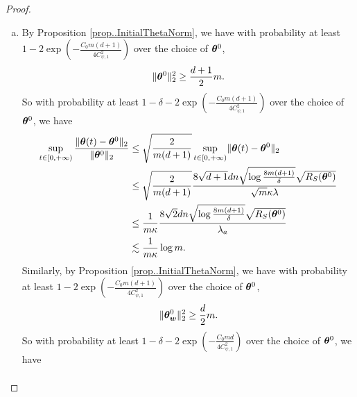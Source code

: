 \documentclass{article}
\begin{document}
\begin{proof}
\begin{enumerate}[(a)]
\begin{enumerate}[(i)]
\begin{equation*}
                        \end{equation*}
                        Suppose that $t^*_a<+\infty$ then one can take the limit $t\to t^*_a$ in~\eqref{thm-proof:w-step1}. This will lead to a contradiction with the definition of $t^*_a$. Therefore $t^*_a=+\infty$.
              \end{enumerate}
        \item By Proposition \ref{prop..InitialThetaNorm}, we have with probability at least $1-2\exp(-\frac{C_0m(d+1)}{4C_{\psi,1}^2})$ over the choice of $\bm{\theta}^0$,
              \begin{equation*}
                  \lVert\bm{\theta}^0\rVert^2_2\geq\frac{d+1}{2}m.
              \end{equation*}
              So with probability at least $1-\delta-2\exp\left(-\frac{C_0m(d+1)}{4C^2_{\psi,1}}\right)$ over the choice of $\bm{\theta}^0$, we have
              \begin{equation*}
                  \begin{aligned}
                      \sup\limits_{t\in[0,+\infty)}\frac{\lVert\bm{\theta}(t)-\bm{\theta}^0\rVert_2}{\lVert\bm{\theta}^0\rVert_2}
                       & \leq \sqrt{\frac{2}{m(d+1)}}\sup\limits_{t\in[0,+\infty)}\lVert\bm{\theta}(t)-\bm{\theta}^0\rVert_2                                          \\
                       & \leq  \sqrt{\frac{2}{m(d+1)}} \frac{8\sqrt{d+1}dn\sqrt{\log\frac{8m(d+1)}{\delta}}\sqrt{R_S(\bm{\theta}^0)}}{\sqrt{m}\kappa\lambda} \\
                       & \leq \frac{1}{m\kappa}\frac{8\sqrt{2}dn\sqrt{\log\frac{8m(d+1)}{\delta}}\sqrt{R_S(\bm{\theta}^0)}}{\lambda_a}                       \\
                       & \lesssim \frac{1}{m\kappa}\log m.
                  \end{aligned}
              \end{equation*}
              Similarly, by Proposition \ref{prop..InitialThetaNorm}, we have with probability at least $1-2\exp(-\frac{C_0m(d+1)}{4C_{\psi,1}^2})$ over the choice of $\bm{\theta}^0$,
              \begin{equation*}
                  \lVert\bm{\theta}_{\bm{w}}^0\rVert^2_2\geq\frac{d}{2}m.
              \end{equation*}
              So with probability at least $1-\delta-2\exp\left(-\frac{C_0md}{4C^2_{\psi,1}}\right)$ over the choice of $\bm{\theta}^0$, we have
              \begin{equation*}
                  \begin{aligned}

\end{aligned}
\end{equation*}
\end{enumerate}
\end{proof}
\end{document}
